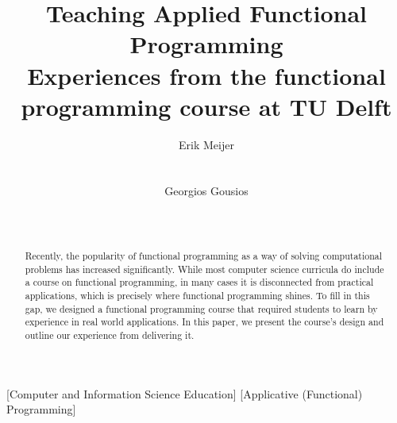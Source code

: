\documentclass[conference]{sig-alternate}
\begin{document}

\title{Teaching Applied Functional Programming\\
\small{Experiences from the functional programming course at TU Delft}
}


\author{
\alignauthor
Erik Meijer\\
       \\
       \\
\alignauthor
Georgios Gousios\\
       \\
       \\       
}

\maketitle

\begin{abstract}

  Recently, the popularity of functional programming as a way of
  solving computational problems has increased significantly. While most
  computer science curricula do include a course on functional programming, in
  many cases it is disconnected from practical applications, which is
  precisely where functional programming shines. To fill in this gap, we
  designed a functional programming course that required students to
  learn by experience in real world applications. In this paper, we present
  the course's design and outline our experience from delivering it.

\end{abstract}

[Computer and Information Science Education]
[Applicative (Functional) Programming]


\end{document}
